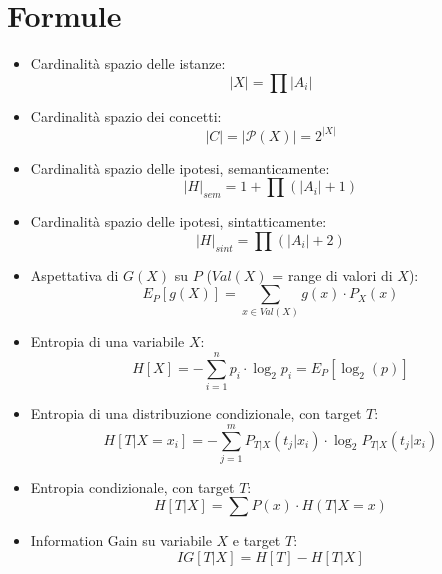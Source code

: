 \documentclass[a4paper,12pt, oneside]{article}
\title{}
\author{}
\date{}
\begin{document}

\newtheorem{teorema}{Teorema}
\newtheorem{definizione}{Definizione}
\newtheorem{esempio}{Esempio}
\newtheorem{corollario}{Corollario}
\newtheorem{lemma}{Lemma}
\newtheorem{osservazione}{Osservazione}
\newtheorem{nota}{Nota}
\newtheorem{esercizio}{Esercizio}

\renewcommand{\sectionmark}[1]{\markright{\thesection.\ #1}}
\allsectionsfont{\centering}
\section*{Formule}
\begin{itemize}
  \item Cardinalità spazio delle istanze:
  \[|X|=\prod |A_i|\]
  \item Cardinalità spazio dei concetti:
  \[|C|=|\mathcal{P}(X)|=2^{|X|}\]
  \item Cardinalità spazio delle ipotesi, semanticamente:
  \[|H|_{sem}=1+\prod (|A_i|+1)\]
  \item Cardinalità spazio delle ipotesi, sintatticamente:
  \[|H|_{sint}=\prod (|A_i|+2)\]
  \item Aspettativa di $G(X)$ su $P$ ($Val(X)$ = range di valori di $X$):
  \[E_P[g(X)]=\sum_{x\in Val(X)} g(x)\cdot P_X(x)\]
  \item Entropia di una variabile $X$:
  \[H[X]=-\sum_{i=1}^n p_i\cdot\log_2 p_i=E_P[\log_2(p)]\]
  \item Entropia di una distribuzione condizionale, con target $T$:
  \[H[T|X=x_i]=-\sum_{j=1}^m P_{T|X}(t_j|x_i)\cdot \log_2 P_{T|X}(t_j|x_i)\]
  \item Entropia condizionale, con target $T$:
  \[H[T|X]=\sum P(x)\cdot H(T|X=x)\]
  \item Information Gain su variabile $X$ e target $T$:
  \[IG[T|X]=H[T]-H[T|X]\]

\end{itemize}
\newpage
\end{document}
